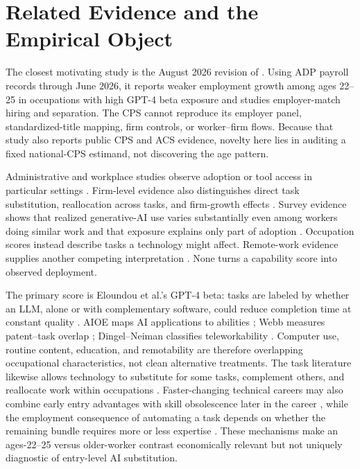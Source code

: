\section{Related Evidence and the Empirical Object}\label{sec:literature}

The closest motivating study is the August 2026 revision of \citet{brynjolfsson2026canaries}.  Using ADP payroll records through June 2026, it reports weaker employment growth among ages 22--25 in occupations with high GPT-4 beta exposure and studies employer-match hiring and separation.  The CPS cannot reproduce its employer panel, standardized-title mapping, firm controls, or worker--firm flows.  Because that study also reports public CPS and ACS evidence, novelty here lies in auditing a fixed national-CPS estimand, not discovering the age pattern.

Administrative and workplace studies observe adoption or tool access in particular settings \citep{humlum2025still,brynjolfsson2025generative}.  Firm-level evidence also distinguishes direct task substitution, reallocation across tasks, and firm-growth effects \citep{hampole2025artificial}.  Survey evidence shows that realized generative-AI use varies substantially even among workers doing similar work and that exposure explains only part of adoption \citep{bick2026work}.  Occupation scores instead describe tasks a technology might affect.  Remote-work evidence supplies another competing interpretation \citep{emanuel2026proximity}.  None turns a capability score into observed deployment.

The primary score is Eloundou et al.'s GPT-4 beta: tasks are labeled by whether an LLM, alone or with complementary software, could reduce completion time at constant quality \citep{eloundou2024gpts}.  AIOE maps AI applications to abilities \citep{felten2018method,felten2021occupational}; Webb measures patent--task overlap \citep{webb2020impact}; Dingel--Neiman classifies teleworkability \citep{dingel2020home}.  Computer use, routine content, education, and remotability are therefore overlapping occupational characteristics, not clean alternative treatments.  The task literature likewise allows technology to substitute for some tasks, complement others, and reallocate work within occupations \citep{autor2003skill,autor2013growth,acemoglu2019automation}.  Faster-changing technical careers may also combine early entry advantages with skill obsolescence later in the career \citep{deming2020earnings}, while the employment consequence of automating a task depends on whether the remaining bundle requires more or less expertise \citep{autor2025expertise}.  These mechanisms make an ages-22--25 versus older-worker contrast economically relevant but not uniquely diagnostic of entry-level AI substitution.

